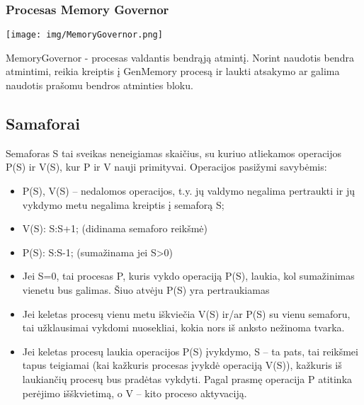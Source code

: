 \subsubsection{Procesas Memory Governor}

\texttt{[image: img/MemoryGovernor.png]}

MemoryGovernor - procesas valdantis bendrąją atmintį. Norint naudotis bendra atmintimi, reikia kreiptis į GenMemory procesą ir laukti atsakymo ar galima naudotis prašomu bendros atminties bloku.
\subsection{Samaforai}

Semaforas S tai sveikas neneigiamas skaičius, su kuriuo atliekamos operacijos P(S) ir V(S), kur P ir V nauji primityvai. Operacijos pasižymi savybėmis:
\begin{itemize}
	\item P(S), V(S) – nedalomos operacijos, t.y. jų valdymo negalima pertraukti ir jų vykdymo metu negalima kreiptis į semaforą S;
	\item V(S):     S:S+1; (didinama semaforo reikšmė)
	\item P(S):      S:S-1; (sumažinama jei S>0)
	\item Jei S=0, tai procesas P, kuris vykdo operaciją P(S), laukia, kol sumažinimas vienetu bus galimas. Šiuo atvėju P(S) yra pertraukiamas
	\item Jei keletas procesų vienu metu iškviečia V(S) ir/ar P(S) su vienu semaforu, tai užklausimai vykdomi nuosekliai, kokia nors iš anksto nežinoma tvarka.
	\item Jei keletas procesų laukia operacijos P(S) įvykdymo, S – ta pats, tai reikšmei tapus teigiamai (kai kažkuris procesas įvykdė operaciją V(S)), kažkuris iš laukiančių procesų bus pradėtas vykdyti.
Pagal prasmę operacija P atitinka perėjimo išškvietimą, o V – kito proceso aktyvaciją.
\end{itemize}
